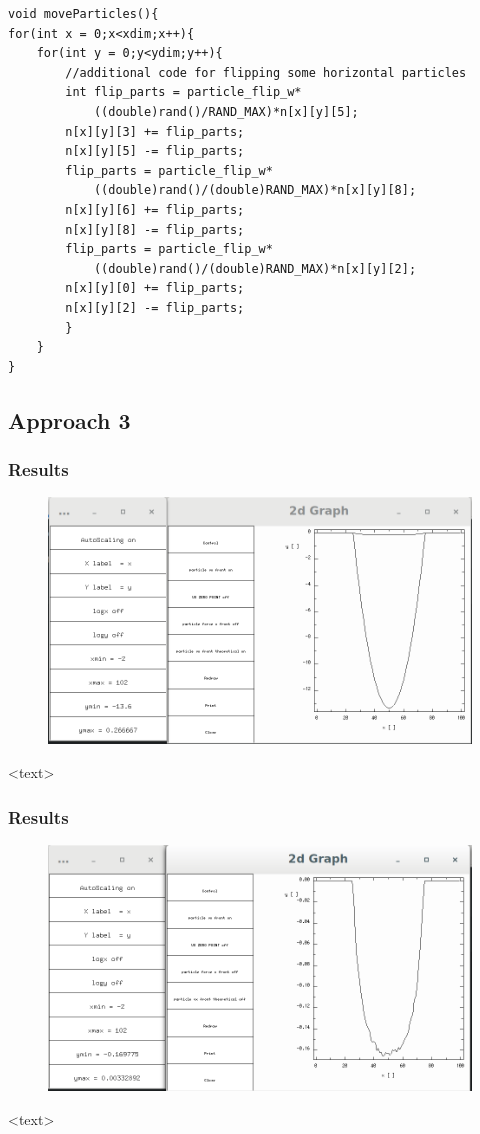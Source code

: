 \documentclass{beamer}
\begin{document}
\begin{frame}[fragile]
\begin{lstlisting}
void moveParticles(){
for(int x = 0;x<xdim;x++){
	for(int y = 0;y<ydim;y++){
		//additional code for flipping some horizontal particles
		int flip_parts = particle_flip_w*
			((double)rand()/RAND_MAX)*n[x][y][5];
		n[x][y][3] += flip_parts;
		n[x][y][5] -= flip_parts;
		flip_parts = particle_flip_w*
			((double)rand()/(double)RAND_MAX)*n[x][y][8];
		n[x][y][6] += flip_parts;
		n[x][y][8] -= flip_parts;
		flip_parts = particle_flip_w*
			((double)rand()/(double)RAND_MAX)*n[x][y][2];
		n[x][y][0] += flip_parts;
		n[x][y][2] -= flip_parts;
		}
	}
}
\end{lstlisting}
\end{frame}

\subsection{Approach 3}

\begin{frame}
\frametitle{Results}
\begin{figure}
\includegraphics[scale=0.2]{A3p0}
\caption{}
\end{figure}
<text>
\end{frame}

\begin{frame}
\frametitle{Results}
\begin{figure}
\includegraphics[scale=0.2]{A2p3}
\caption{}
\end{figure}
<text>
\end{frame}
\end{document}
